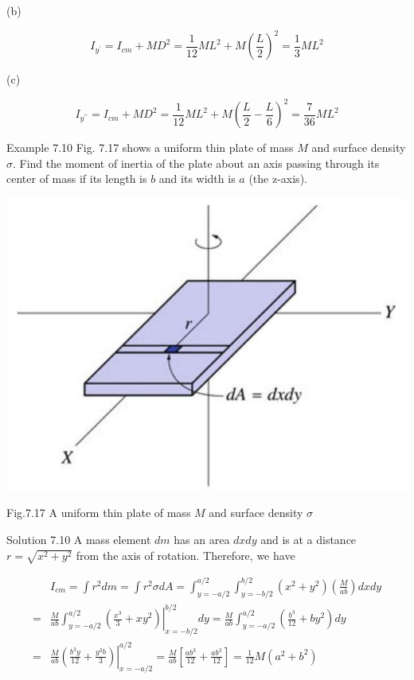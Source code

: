 \documentclass[10pt]{article}
\begin{document}
(b)

$$
I_{y^{\prime}}=I_{c m}+M D^{2}=\frac{1}{12} M L^{2}+M\left(\frac{L}{2}\right)^{2}=\frac{1}{3} M L^{2}
$$

(c)

$$
I_{y^{\prime \prime}}=I_{c m}+M D^{2}=\frac{1}{12} M L^{2}+M\left(\frac{L}{2}-\frac{L}{6}\right)^{2}=\frac{7}{36} M L^{2}
$$

Example 7.10 Fig. 7.17 shows a uniform thin plate of mass $M$ and surface density $\sigma$. Find the moment of inertia of the plate about an axis passing through its center of mass if its length is $b$ and its width is $a$ (the z-axis).

\begin{center}
\includegraphics[max width=\textwidth]{2024_09_13_db1f357d2aad0a03eb2eg-120}
\end{center}

Fig.7.17 A uniform thin plate of mass $M$ and surface density $\sigma$

Solution 7.10 A mass element $d m$ has an area $d x d y$ and is at a distance $r=\sqrt{x^{2}+y^{2}}$ from the axis of rotation. Therefore, we have

$$
\begin{aligned}
& I_{c m}=\int r^{2} d m=\int r^{2} \sigma d A=\int_{y=-a / 2}^{a / 2} \int_{y=-b / 2}^{b / 2}\left(x^{2}+y^{2}\right)\left(\frac{M}{a b}\right) d x d y \\
= & \left.\frac{M}{a b} \int_{y=-a / 2}^{a / 2}\left(\frac{x^{3}}{3}+x y^{2}\right)\right|_{x=-b / 2} ^{b / 2} d y=\frac{M}{a b} \int_{y=-a / 2}^{a / 2}\left(\frac{b^{3}}{12}+b y^{2}\right) d y \\
= & \left.\frac{M}{a b}\left(\frac{b^{3} y}{12}+\frac{y^{3} b}{3}\right)\right|_{x=-a / 2} ^{a / 2}=\frac{M}{a b}\left[\frac{a b^{3}}{12}+\frac{a b^{3}}{12}\right]=\frac{1}{12} M\left(a^{2}+b^{2}\right)
\end{aligned}
$$
\end{document}
